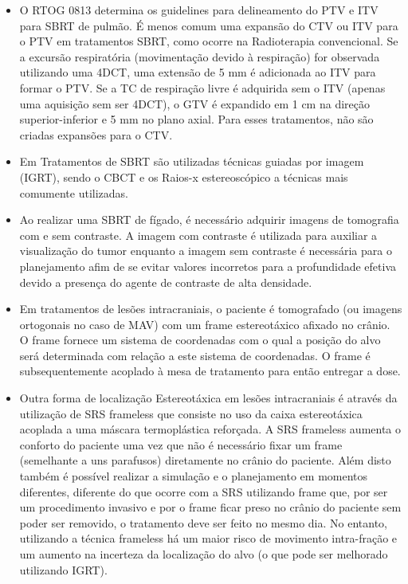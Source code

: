 \documentclass[11pt,a4paper]{article}
\newcounter{exemplo}
\begin{document}
\begin{exemplo}
\begin{itemize}
        \item O RTOG 0813 determina os guidelines para delineamento do PTV e ITV para SBRT de pulmão. É menos comum uma expansão do CTV ou ITV para o PTV em tratamentos SBRT, como ocorre na Radioterapia convencional. Se a excursão respiratória (movimentação devido à respiração) for observada utilizando uma 4DCT, uma extensão de 5 mm é adicionada ao ITV para formar o PTV. Se a TC de respiração livre é adquirida sem o ITV (apenas uma aquisição sem ser 4DCT), o GTV é expandido em 1 cm na direção superior-inferior e 5 mm no plano axial. Para esses tratamentos, não são criadas expansões para o CTV.
        
        \item Em Tratamentos de SBRT são utilizadas técnicas guiadas por imagem (IGRT), sendo o CBCT e os Raios-x estereoscópico a técnicas mais comumente utilizadas.
        
        \item Ao realizar uma SBRT de fígado, é necessário adquirir imagens de tomografia com e sem contraste. A imagem com contraste é utilizada para auxiliar a visualização do tumor enquanto a imagem sem contraste é necessária para o planejamento afim de se evitar valores incorretos para a profundidade efetiva devido a presença do agente de contraste de alta densidade. 
        
        \item Em tratamentos de lesões intracraniais, o paciente é tomografado (ou imagens ortogonais no caso de MAV) com um frame estereotáxico afixado no crânio. O frame fornece um sistema de coordenadas com o qual a posição do alvo será determinada com relação a este sistema de coordenadas. O frame é subsequentemente acoplado à mesa de tratamento para então entregar a dose. 
        
        \item Outra forma de localização Estereotáxica em lesões intracraniais é através da utilização de SRS frameless que consiste no uso da caixa estereotáxica acoplada a uma máscara termoplástica reforçada. A SRS frameless aumenta o conforto do paciente uma vez que não é necessário fixar um frame (semelhante a uns parafusos) diretamente no crânio do paciente. Além disto também é possível realizar a simulação e o planejamento em momentos diferentes, diferente do que ocorre com  a SRS utilizando frame que, por ser um procedimento invasivo e por o frame ficar preso no crânio do paciente sem poder ser removido, o tratamento deve ser feito no mesmo dia. No entanto, utilizando a técnica frameless há um maior risco de movimento intra-fração e um aumento na incerteza da localização do alvo (o que pode ser melhorado utilizando IGRT).
        

\end{itemize}
\end{exemplo}
\end{document}
